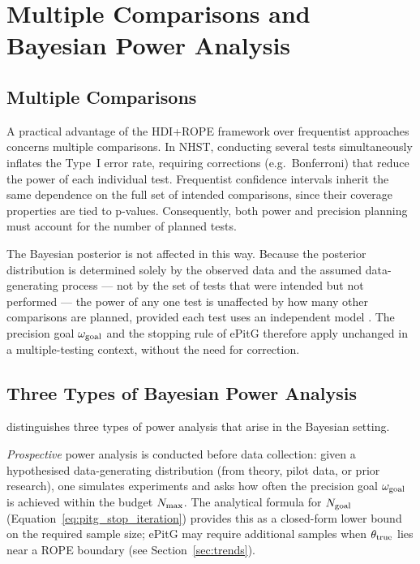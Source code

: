 \section{Multiple Comparisons and Bayesian Power Analysis}\label{app:multiple_comparisons}

\subsection*{Multiple Comparisons}

A practical advantage of the HDI+ROPE framework over frequentist approaches concerns
multiple comparisons. In NHST, conducting several tests simultaneously inflates the
Type~I error rate, requiring corrections (e.g.\ Bonferroni) that reduce the power of
each individual test. Frequentist confidence intervals inherit the same dependence on
the full set of intended comparisons, since their coverage properties are tied to
p-values. Consequently, both power and precision planning must account for the number
of planned tests.

The Bayesian posterior is not affected in this way. Because the posterior distribution
is determined solely by the observed data and the assumed data-generating process ---
not by the set of tests that were intended but not performed --- the power of any one
test is unaffected by how many other comparisons are planned, provided each test uses
an independent model \citep{gelman2012, kruschke2015doing}.
The precision goal $\omega_{\rm goal}$ and the stopping rule of ePitG therefore apply
unchanged in a multiple-testing context, without the need for correction.

\subsection*{Three Types of Bayesian Power Analysis}

\citet{kruschke2015doing} distinguishes three types of power analysis that arise in
the Bayesian setting.

\textit{Prospective} power analysis is conducted before data collection: given a
hypothesised data-generating distribution (from theory, pilot data, or prior research),
one simulates experiments and asks how often the precision goal $\omega_{\rm goal}$ is
achieved within the budget $N_{\rm max}$.
The analytical formula for $N_{\rm goal}$ (Equation~\ref{eq:pitg_stop_iteration})
provides this as a closed-form lower bound on the required sample size; ePitG may
require additional samples when $\theta_{\rm true}$ lies near a ROPE boundary
(see Section~\ref{sec:trends}).

